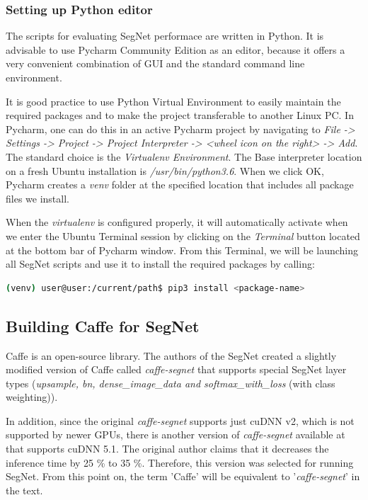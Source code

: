 \subsubsection{Setting up Python editor}

The scripts for evaluating SegNet performace are written in Python. It is advisable to use Pycharm Community Edition as an editor, because it offers a very convenient combination of GUI and the standard command line environment.

It is good practice to use Python Virtual Environment to easily maintain the required packages and to make the project transferable to another Linux PC. In Pycharm, one can do this in an active Pycharm project by navigating to \textit{File -> Settings -> Project -> Project Interpreter -> <wheel icon on the right> -> Add}. The standard choice is the \textit{Virtualenv Environment}. The Base interpreter location on a fresh Ubuntu installation is \textit{/usr/bin/python3.6}. When we click OK, Pycharm creates a \textit{venv} folder at the specified location that includes all package files we install.

When the \textit{virtualenv} is configured properly, it will automatically activate when we enter the Ubuntu Terminal session by clicking on the \textit{Terminal} button located at the bottom bar of Pycharm window. From this Terminal, we will be launching all SegNet scripts and use it to install the required packages by calling:

\begin{lstlisting}[language=bash]
(venv) user@user:/current/path$ pip3 install <package-name>
\end{lstlisting}

\subsection{Building Caffe for SegNet} 

Caffe is an open-source library. The authors of the SegNet created a slightly modified version of Caffe called \textit{caffe-segnet} that supports special SegNet layer types (\textit{upsample, bn, dense\_image\_data and softmax\_with\_loss} (with class weighting)).

In addition, since the original \textit{caffe-segnet} supports just cuDNN v2, which is not supported by newer GPUs, there is another version of \textit{caffe-segnet} available at \cite{filip_github_caffe} that supports cuDNN 5.1. The original author claims that it decreases the inference time by 25 \% to 35 \%. Therefore, this version was selected for running SegNet. From this point on, the term 'Caffe' will be equivalent to '\textit{caffe-segnet}' in the text.

